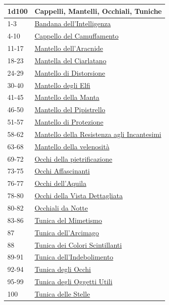 \begin{multicols}{2}
{{\small\begin{tabularx}{0.45\textwidth}{lX}
		\toprule
\textbf{1d100} & \textbf{Cappelli, Mantelli, Occhiali, Tuniche}\\
\toprule
1-3 & \hyperlink{Bandanadell'Intelligenza}{Bandana dell'Intelligenza}\\
4-10 & \hyperlink{CappellodelCamuffamento}{Cappello del Camuffamento}\\
11-17 & \hyperlink{Mantellodell'Aracnide}{Mantello dell'Aracnide}\\
18-23 & \hyperlink{MantelladelCiarlatano}{Mantella del Ciarlatano}\\
24-29 & \hyperlink{MantellodiDistorsione}{Mantello di Distorsione}\\
30-40 & \hyperlink{MantellodegliElfi}{Mantello degli Elfi}\\
41-45 & \hyperlink{MantellodellaManta}{Mantello della Manta}\\
46-50 & \hyperlink{MantellodelPipistrello}{Mantello del Pipistrello}\\
51-57 & \hyperlink{MantellodiProtezione}{Mantello di Protezione}\\
58-62 & \hyperlink{MantellodellaResistenzaagliIncantesimi}{Mantello della Resistenza agli Incantesimi}\\
63-68 & \hyperlink{Mantellodellavelenosità}{Mantello della velenosità}\\
69-72 & \hyperlink{Occhidellapietrificazione}{Occhi della pietrificazione}\\
73-75 & \hyperlink{OcchiAffascinanti}{Occhi Affascinanti}\\
76-77 & \hyperlink{Occhidell'Aquila}{Occhi dell'Aquila}\\
78-80 & \hyperlink{OcchidellaVistaDettagliata}{Occhi della Vista Dettagliata}\\
80-82 & \hyperlink{OcchialidaNotte}{Occhiali da Notte}\\
83-86 & \hyperlink{TunicadelMimetismo}{Tunica del Mimetismo}\\
87 & \hyperlink{Tunicadell'Arcimago}{Tunica dell'Arcimago}\\
88 & \hyperlink{TunicadeiColoriScintillanti}{Tunica dei Colori Scintillanti}\\
89-91 & \hyperlink{Tunicadell'Indebolimento}{Tunica dell'Indebolimento}\\
92-94 & \hyperlink{TunicadegliOcchi}{Tunica degli Occhi}\\
95-99 & \hyperlink{TunicadegliOggettiUtili}{Tunica degli Oggetti Utili}\\
100 & \hyperlink{TunicadelleStelle}{Tunica delle Stelle}
\end{tabularx}}

}
\end{multicols}
